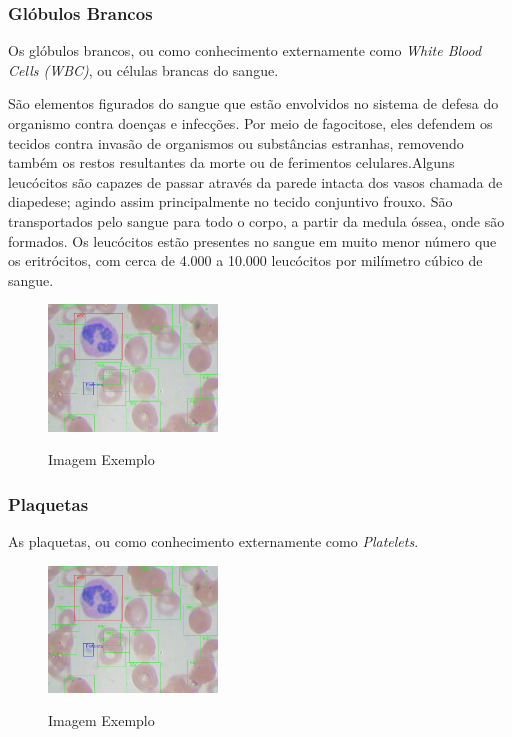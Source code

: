 \subsubsection{Glóbulos Brancos}
Os glóbulos brancos, ou como conhecimento externamente como \emph{White Blood Cells (WBC)}, ou células brancas do sangue.

São elementos figurados do sangue que estão envolvidos no sistema de defesa do 
organismo contra doenças e infecções. Por meio de fagocitose, eles defendem os tecidos 
contra invasão de organismos ou substâncias estranhas, removendo também os restos 
resultantes da morte ou de ferimentos celulares.Alguns leucócitos são capazes de passar 
através da parede intacta dos vasos chamada de diapedese; agindo assim principalmente no 
tecido conjuntivo frouxo.
São transportados pelo sangue para todo o corpo, a partir da medula óssea, onde são 
formados. Os leucócitos estão presentes no sangue em muito menor número que os
eritrócitos, com cerca de 4.000 a 10.000 leucócitos por milímetro cúbico de sangue. 

\begin{figure}[!htb]
    \centering
    \caption{Imagem Exemplo}
    \includegraphics[width=0.40\textwidth]{img/example.jpg}
    \label{fig:exemplo2}
 \end{figure}
 
\subsubsection{Plaquetas}
As plaquetas, ou como conhecimento externamente como \emph{Platelets}.

\begin{figure}[!htb]
    \centering
    \caption{Imagem Exemplo}
    \includegraphics[width=0.40\textwidth]{img/example.jpg}
    \label{fig:exemplo3}
 \end{figure}

